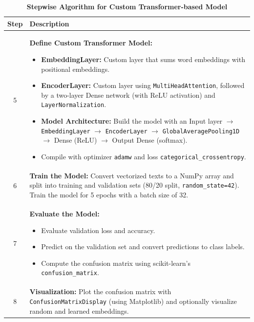\begin{table}[H]
    \caption*{\textbf{Stepwise Algorithm for Custom Transformer-based Model}}
    \label{tab:transformer_algorithm}
    \centering
    \renewcommand{\arraystretch}{1.3}
    \small
    \begin{tabularx}{\textwidth}{|c|X|}
        \hline
        \textbf{Step} & \textbf{Description} \\
        \hline
        5 & \textbf{Define Custom Transformer Model:} 
              \begin{itemize}[noitemsep, topsep=0pt]
                  \item \textbf{EmbeddingLayer:} Custom layer that sums word embeddings with positional embeddings.
                  \item \textbf{EncoderLayer:} Custom layer using \texttt{MultiHeadAttention}, followed by a two-layer Dense network (with ReLU activation) and \texttt{LayerNormalization}.
                  \item \textbf{Model Architecture:} Build the model with an Input layer $\to$ \texttt{EmbeddingLayer} $\to$ \texttt{EncoderLayer} $\to$ \texttt{GlobalAveragePooling1D} $\to$ Dense (ReLU) $\to$ Output Dense (softmax). 
                  \item Compile with optimizer \texttt{adamw} and loss \texttt{categorical\_crossentropy}.
              \end{itemize} \\
        \hline
        6 & \textbf{Train the Model:} Convert vectorized texts to a NumPy array and split into training and validation sets (80/20 split, \texttt{random\_state=42}). Train the model for 5 epochs with a batch size of 32. \\
        \hline
        7 & \textbf{Evaluate the Model:} 
              \begin{itemize}[noitemsep, topsep=0pt]
                  \item Evaluate validation loss and accuracy.
                  \item Predict on the validation set and convert predictions to class labels.
                  \item Compute the confusion matrix using scikit-learn's \texttt{confusion\_matrix}.
              \end{itemize} \\
        \hline
        8 & \textbf{Visualization:} Plot the confusion matrix with \texttt{ConfusionMatrixDisplay} (using Matplotlib) and optionally visualize random and learned embeddings. \\
        \hline
    \end{tabularx}
\end{table}

